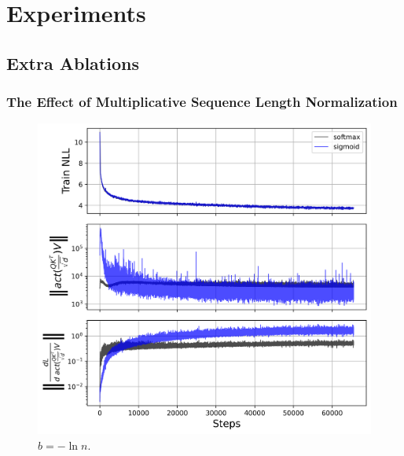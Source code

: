 \vspace{-0.1in}
\section{Experiments}
\label{sec:appendix_experiments}
\vspace{-0.1in}
\subsection{Extra Ablations}
\label{sec:appendix_ablations}
\subsubsection{The Effect of Multiplicative Sequence Length Normalization}
\label{sec:appendix_normalization}
\begin{figure}[htbp]
    \centering
    \begin{minipage}{0.31\textwidth}
        \centering
        \includegraphics[width=\textwidth]{figures/attn_norm_seed1000001_softmax_vs_sigmoid.png}
        \captionsetup{justification=centering}
        \caption{$b = -\ln n$.}
        \label{fig:no_scaling}
    \end{minipage}\hfill
    \begin{minipage}{0.31\textwidth}
        \centering        

\end{minipage}
\end{figure}
